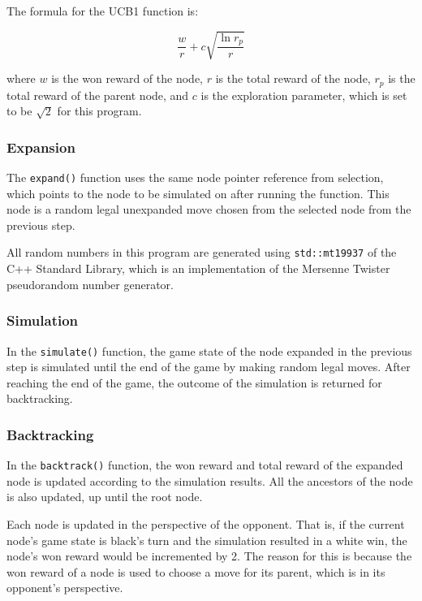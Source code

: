 \documentclass[12pt, a4paper]{article}
\begin{document}
    The formula for the UCB1 function is:

    \begin{equation*}
        \frac{w}{r} + c \sqrt{\frac{\ln{r_p}}{r}}
    \end{equation*}

    where $w$ is the won reward of the node, $r$ is the total reward of the node, $r_p$ is the total reward of the parent node, and $c$ is the exploration parameter, which is set to be $\sqrt{2}$ for this program.

    \subsubsection{Expansion}

    The {\tt expand()} function uses the same node pointer reference from selection, which points to the node to be simulated on after running the function. This node is a random legal unexpanded move chosen from the selected node from the previous step.
    
    All random numbers in this program are generated using {\tt std::mt19937} of the C++ Standard Library, which is an implementation of the Mersenne Twister pseudorandom number generator.
    
    \subsubsection{Simulation}

    In the {\tt simulate()} function, the game state of the node expanded in the previous step is simulated until the end of the game by making random legal moves. After reaching the end of the game, the outcome of the simulation is returned for backtracking.

    \subsubsection{Backtracking}

    In the {\tt backtrack()} function, the won reward and total reward of the expanded node is updated according to the simulation results. All the ancestors of the node is also updated, up until the root node. 
    
    Each node is updated in the perspective of the opponent. That is, if the current node's game state is black's turn and the simulation resulted in a white win, the node's won reward would be incremented by 2. The reason for this is because the won reward of a node is used to choose a move for its parent, which is in its opponent's perspective.
\end{document}
